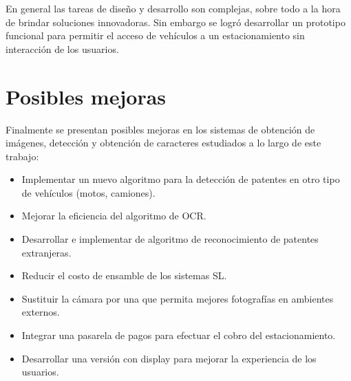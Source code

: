 En general las tareas de diseño y desarrollo son complejas, sobre todo a la hora de brindar soluciones innovadoras.
Sin embargo se logró desarrollar un prototipo funcional para permitir el acceso de vehículos a un estacionamiento sin interacción de los usuarios.

\section{Posibles mejoras}
Finalmente se presentan posibles mejoras en los sistemas de obtención de imágenes, detección y obtención de caracteres estudiados a lo largo de este trabajo:
\begin{itemize}
    \item Implementar un nuevo algoritmo para la detección de patentes en otro tipo de vehículos (motos, camiones).
    \item Mejorar la eficiencia del algoritmo de OCR.
    \item Desarrollar e implementar de algoritmo de reconocimiento de patentes extranjeras.
    \item Reducir el costo de ensamble de los sistemas SL.
    \item Sustituir la cámara por una que permita mejores fotografías en ambientes externos.
    \item Integrar una pasarela de pagos para efectuar el cobro del estacionamiento.
    \item Desarrollar una versión con display para mejorar la experiencia de los usuarios.
\end{itemize}
